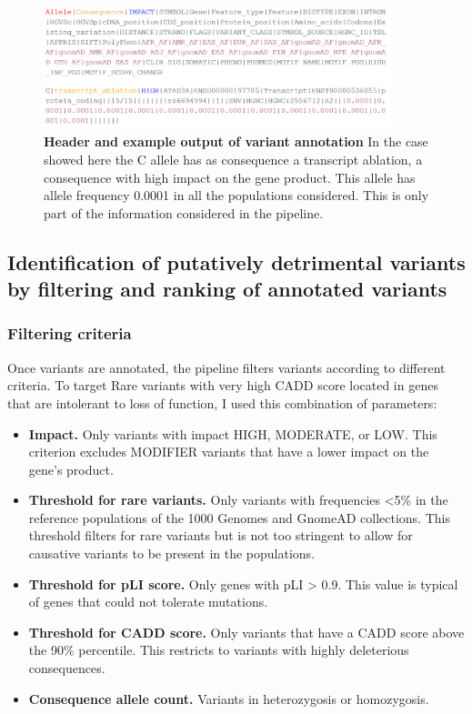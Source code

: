 \begin{figure}[H]
\centering
\includegraphics[width=0.9\textwidth]{fig/vep_example_output.PNG}
\decoRule
\caption[Summary Consequence]{\textbf{Header and example output of variant annotation} In the case showed here the C allele has as consequence a transcript ablation, a consequence with high impact on the gene product. This allele has allele frequency 0.0001 in all the populations considered. This is only part of the information considered in the pipeline.}
\label{fig:vep_example_output}
\end{figure}

\subsection{Identification of putatively detrimental variants by filtering and ranking of annotated variants}

\subsubsection{Filtering criteria}
Once variants are annotated, the pipeline filters variants according to different criteria. To target Rare variants with very high CADD score located in genes that are intolerant to loss of function, I used this combination of parameters: 

\begin{itemize}
\item \textbf{Impact.} Only variants with impact HIGH, MODERATE, or LOW. This criterion excludes MODIFIER variants that have a lower impact on the gene's product.
\item \textbf{Threshold for rare variants.} Only variants with frequencies <5\% in the reference populations of the 1000 Genomes and GnomeAD collections. This threshold filters for rare variants but is not too stringent to allow for causative variants to be present in the populations.
\item \textbf{Threshold for pLI score.} Only genes with pLI > 0.9. This value is typical of genes that could not tolerate mutations\cite{lek2016analysis}.
\item \textbf{Threshold for CADD score.} Only variants that have a CADD score above the 90\% percentile. This restricts to variants with highly deleterious consequences. 
\item \textbf{Consequence allele count.} Variants in heterozygosis or homozygosis.
\end{itemize}
